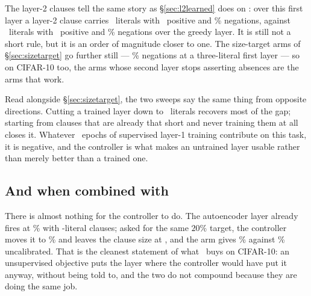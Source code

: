 The layer-2 clauses tell the same story as \S\ref{sec:l2learned} does on : over
this first layer a layer-2 clause carries \sizeMctmRandomCalib\ literals with
\posMctmRandomCalib\ positive and \negMctmRandomCalib{}\% negations, against \sizeMctm\
literals with \posMctm\ positive and \negMctm{}\% negations over the greedy layer. It is still
not a short rule, but it is an order of magnitude closer to one. The size-target arms of
\S\ref{sec:sizetarget} go further still --- \negMctmSizeKThree{}\% negations at a three-literal
first layer --- so on CIFAR-10 too, the arms whose second layer stops asserting absences are
the arms that work.

Read alongside \S\ref{sec:sizetarget}, the two sweeps say the same thing from opposite
directions. Cutting a trained layer down to \sizeBestTarget\ literals recovers most of the gap;
starting from clauses that are already that short and never training them at all closes it.
Whatever \epochsRun\ epochs of supervised layer-1 training contribute on this task, it is
negative, and the controller is what makes an untrained layer usable rather than merely
better than a trained one.

\subsection{And when combined with \ideaA}

There is almost nothing for the controller to do. The autoencoder layer already fires at
\fireAutoPre{}\% with \sizeAutoPre-literal clauses; asked for the same $20\%$ target, the
controller moves it to \calibFireMctmAutoCalib{}\% and leaves the clause size at
\calibSizeMctmAutoCalib, and the arm gives \accMctmAutoCalib{}\% against \accMctmAuto{}\%
uncalibrated. That is the cleanest statement of what \ideaA\ buys on CIFAR-10: an unsupervised
objective puts the layer where the controller would have put it anyway, without being told to,
and the two do not compound because they are doing the same job.
